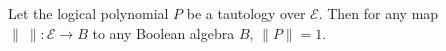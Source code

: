 Let the logical polynomial $P$ be a tautology over $\mathcal{E}$. Then for any map $\|~\|: \mathcal{E} \to B$ to any Boolean algebra $B$, $\|P\| = 1$.
